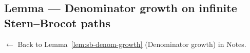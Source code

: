 %



\subsection*{Lemma --- Denominator growth on infinite Stern--Brocot paths}
\label{prf:sb-denom-growth}

\begin{remark*}[Return]
$\leftarrow$ Back to Lemma~\ref{lem:sb-denom-growth} (Denominator growth) in Notes.
\end{remark*}

